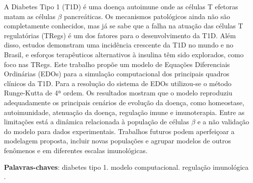 \begin{agradecimentos}

\end{agradecimentos}


\begin{resumo}
        A Diabetes Tipo 1 (T1D) é uma doença autoimune onde as células T efetoras matam as células $\beta$ pancreáticas. Os mecanismos patológicos ainda não são completamente conhecidos, mas já se sabe que a falha na atuação das células T regulatórias (TRegs) é um dos fatores para o desenvolvimento da T1D.
        Além disso, estudos demonstram uma incidência crescente da T1D no mundo e no Brasil, e esforços terapêuticos alternativos à insulina têm sido explorados, como foco nas TRegs. Este trabalho propõe um modelo de Equações Diferenciais Ordinárias (EDOs) para a simulação computacional dos principais quadros clínicos da T1D. Para a resolução do sistema de EDOs utilizou-se o método Runge-Kutta de 4ª ordem. Os resultados mostram que o modelo reproduziu adequadamente os principais cenários de evolução da doença, como homeostase, autoimunidade, atenuação da doença, regulação imune e imunoterapia. Entre as limitações está a dinâmica relacionada à população de células $\beta$ e a não validação do modelo para dados experimentais. Trabalhos futuros podem aperfeiçoar a modelagem proposta, incluir novas populações e agrupar modelos de outros fenômenos e em diferentes escalas imunológicas. 
	
	\vspace{\onelineskip}
	
	\noindent
	\textbf{Palavras-chaves}: diabetes tipo 1. modelo computacional. regulação imunológica .
\end{resumo}

